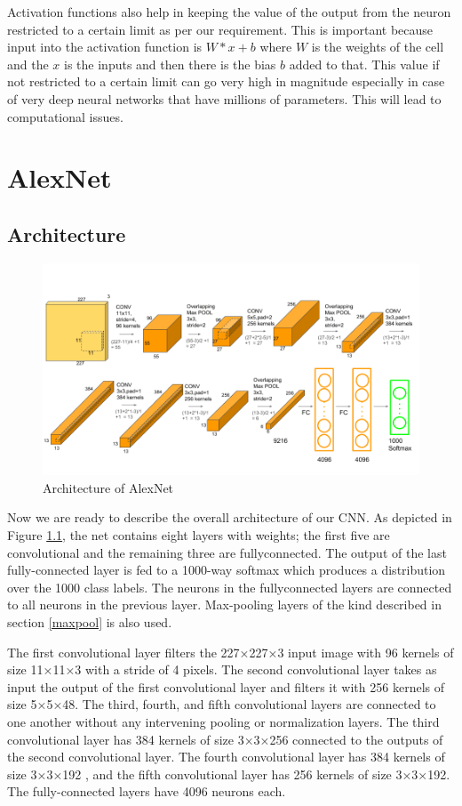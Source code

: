 \documentclass[11pt]{report}
\begin{document}
Activation functions also help in keeping the value of the output from the neuron restricted to a certain limit as per our requirement. This is important because input into the activation function is $W*x + b$ where $W$ is the weights of the cell and the $x$ is the inputs and then there is the bias $b$ added to that. This value if not restricted to a certain limit can go very high in magnitude especially in case of very deep neural networks that have millions of parameters. This will lead to computational issues.

\chapter{AlexNet}
\section{Architecture}
\begin{figure}[!h]
	\includegraphics[scale=0.32]{architecture.png}
	\centering 
	\caption{Architecture of AlexNet}
	\label{archi}
\end{figure}

Now we are ready to describe the overall architecture of our CNN. As depicted in Figure \ref{archi}, the net contains eight layers with weights; the first five are convolutional and the remaining three are fullyconnected. The output of the last fully-connected layer is fed to a 1000-way softmax which produces a distribution over the 1000 class labels. The neurons in the fullyconnected layers are connected to all neurons in the previous layer. Max-pooling layers of the kind described in section \ref{maxpool} is also used.

The first convolutional layer filters the 227×227×3 input image with 96 kernels of size 11×11×3 with a stride of 4 pixels. The second convolutional layer takes as input the  output of the first convolutional layer and filters it with 256 kernels of size 5×5×48.
The third, fourth, and fifth convolutional layers are connected to one another without any intervening
pooling or normalization layers. The third convolutional layer has 384 kernels of size 3×3×256 connected to the outputs of the second convolutional layer. The fourth
convolutional layer has 384 kernels of size 3×3×192 , and the fifth convolutional layer has 256
kernels of size 3×3×192. The fully-connected layers have 4096 neurons each.
\end{document}
